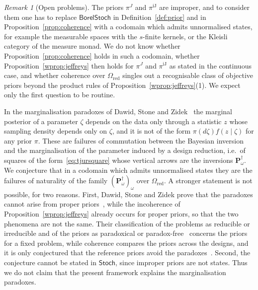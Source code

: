 \documentclass[11pt,a4paper]{article}
\theoremstyle{plain}
\theoremstyle{definition}
\theoremstyle{remark}
\newtheorem{remark}[theorem]{Remark}
\newcommand{\cat}[1]{\mathsf{#1}}
\newcommand{\catO}{\cat{\Omega}}
\newcommand{\Stoch}{\cat{Stoch}}
\newcommand{\BorelStoch}{\cat{BorelStoch}}
\begin{document}
\begin{remark}[Open problems]\label{rem:open}
The priors $\pi^{J}$ and $\pi^{\mathrm{iJ}}$ are improper, and to consider them
one has to replace $\BorelStoch$ in Definition~\ref{def:prior} and in
Proposition~\ref{prop:coherence} with a codomain which admits unnormalised
states, for example the measurable spaces with the $s$-finite kernels, or the
Kleisli category of the measure monad. We do not know whether
Proposition~\ref{prop:coherence} holds in such a codomain, whether
Proposition~\ref{wprop:jeffreys} then holds for $\pi^{J}$ and
$\pi^{\mathrm{iJ}}$ as stated in the continuous case, and whether coherence
over $\catO_{\mathrm{red}}$ singles out a recognisable class of objective
priors beyond the product rules of Proposition~\ref{wprop:jeffreys}(1). We
expect only the first question to be routine.

In the marginalisation paradoxes of Dawid, Stone and
Zidek~\cite[\S1 and Thm.~2.1, p.~198]{dawid_stone_zidek_1973} the marginal
posterior of a parameter $\zeta$ depends on the data only through a statistic
$z$ whose sampling density depends only on $\zeta$, and it is not of the form
$\pi(d\zeta)f(z\mid\zeta)$ for any prior $\pi$. These are failures of
commutation between the Bayesian inversion and the marginalisation of the
parameter induced by a design reduction, i.e.\ of squares of the
form~\eqref{eq:tjursquare} whose vertical arrows are the inversions
$\mathbf P^{\dagger}_{\omega}$. We conjecture that in a codomain which admits
unnormalised states they are the failures of naturality of the family
$(\mathbf P^{\dagger}_{\omega})_{\omega}$ over $\catO_{\mathrm{red}}$. A
stronger statement is not possible, for two reasons. First, Dawid, Stone and
Zidek prove that the paradoxes cannot arise from proper
priors~\cite[p.~189 and p.~194, eqs.~(1.20)--(1.23)]{dawid_stone_zidek_1973},
while the incoherence of Proposition~\ref{wprop:jeffreys} already occurs for
proper priors, so that the two phenomena are not the same. Their
classification of the problems as reducible or irreducible and of the priors
as paradoxical or
paradox-free~\cite[p.~208]{dawid_stone_zidek_1973} concerns the priors for a
fixed problem, while coherence compares the priors across the designs, and it
is only conjectured that the reference priors avoid the
paradoxes~\cite[p.~123]{bernardo_reference_1979}. Second, the conjecture
cannot be stated in $\Stoch$, since improper priors are not states. Thus we do
not claim that the present framework explains the marginalisation paradoxes.
\end{remark}
\end{document}
